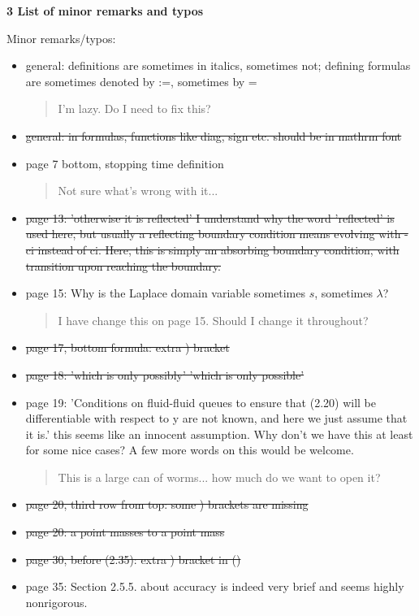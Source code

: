 \documentclass[a4paper]{article}
\begin{document}
\noindent\textbf{3 List of minor remarks and typos}

Minor remarks/typos:
\begin{itemize}
\item general: definitions are sometimes in italics, sometimes not; defining formulas are
sometimes denoted by :=, sometimes by =
\begin{quote}
    I'm lazy. Do I need to fix this?
\end{quote}
\item \st{general: in formulas, functions like diag, sign etc. should be in mathrm font}
\item page 7 bottom, stopping time definition
\begin{quote}
    Not sure what's wrong with it...
\end{quote}
\item \st{page 13: 'otherwise it is reflected' I understand why the word 'reflected' is used here, but usually a reflecting boundary condition means evolving with -ci instead of ci. Here, this is simply an absorbing boundary condition, with transition upon reaching the boundary.}
\item page 15: Why is the Laplace domain variable sometimes \(s\), sometimes \(\lambda\)?
\begin{quote}
    I have change this on page 15. Should I change it throughout?
\end{quote}
\item \st{page 17, bottom formula: extra ) bracket}
\item \st{page 18: 'which is only possibly'  'which is only possible'}
\item page 19: 'Conditions on fluid-fluid queues to ensure that (2.20) will be differentiable with respect to y are not known, and here we just assume that it is.' this seems like an innocent assumption. Why don't we have this at least for some nice cases? A few more words on this would be welcome.
\begin{quote}
    This is a large can of worms... how much do we want to open it?
\end{quote}
\item \st{page 20, third row from top: some ) brackets are missing}
\item \st{page 20: a point masses to a point mass}
\item \st{page 30, before (2.35): extra ) bracket in ()}
\item page 35: Section 2.5.5. about accuracy is indeed very brief and seems highly nonrigorous.

\end{itemize}
\end{document}
